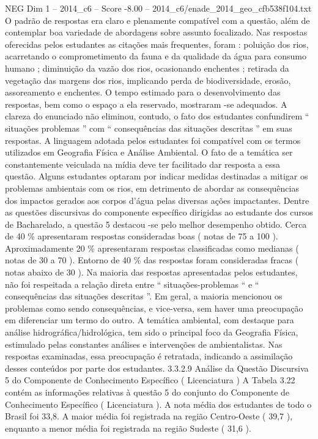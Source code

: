 \begin{textsample}{NEG Dim 1 – 2014\_c6 – Score -8.00 – 2014\_c6/enade\_2014\_geo\_cfb538f104.txt}
O padrão de respostas era claro e plenamente compatível com a questão, além de contemplar boa variedade de abordagens sobre assunto focalizado.
Nas respostas oferecidas pelos estudantes as citações mais frequentes, foram : poluição dos rios, acarretando o comprometimento da fauna e da qualidade da água para consumo humano ; diminuição da vazão dos rios, ocasionando enchentes ; retirada da vegetação das margens dos rios, implicando perda de biodiversidade, erosão, assoreamento e enchentes.
O tempo estimado para o desenvolvimento das respostas, bem como o espaço a ela reservado, mostraram -se adequados.
A clareza do enunciado não eliminou, contudo, o fato dos estudantes confundirem “ situações problemas ” com “ consequências das situações descritas ” em suas respostas.
A linguagem adotada pelos estudantes foi compatível com os termos utilizados em Geografia Física e Análise Ambiental.
O fato de a temática ser constantemente veiculada na mídia deve ter facilitado dar resposta a essa questão.
Alguns estudantes optaram por indicar medidas destinadas a mitigar os problemas ambientais com os rios, em detrimento de abordar as consequências dos impactos gerados aos corpos d'água pelas diversas ações impactantes.
Dentre as questões discursivas do componente específico dirigidas ao estudante dos cursos de Bacharelado, a questão 5 destacou -se pelo melhor desempenho obtido.
Cerca de 40 \% apresentaram respostas consideradas boas ( notas de 75 a 100 ).
Aproximadamente 20 \% apresentaram respostas classificadas como medianas ( notas de 30 a 70 ).
Entorno de 40 \% das respostas foram consideradas fracas ( notas abaixo de 30 ).
Na maioria das respostas apresentadas pelos estudantes, não foi respeitada a relação direta entre “ situações-problemas “ e “ consequências das situações descritas ”.
Em geral, a maioria mencionou os problemas como sendo consequências, e vice-versa, sem haver uma preocupação em diferenciar um termo do outro.
A temática ambiental, com destaque para análise hidrográfica/hidrológica, tem sido o principal foco da Geografia Física, estimulado pelas constantes análises e intervenções de ambientalistas.
Nas respostas examinadas, essa preocupação é retratada, indicando a assimilação desses conteúdos por parte dos estudantes. 3.3.2.9 Análise da Questão Discursiva 5 do Componente de Conhecimento Específico ( Licenciatura ) A Tabela 3.22 contém as informações relativas à questão 5 do conjunto do Componente de Conhecimento Específico ( Licenciatura ).
A nota média dos estudantes de todo o Brasil foi 33,8.
A maior média foi registrada na região Centro-Oeste ( 39,7 ), enquanto a menor média foi registrada na região Sudeste ( 31,6 ).

\end{textsample}

